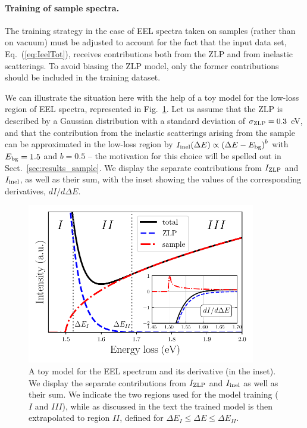 \paragraph{Training of sample spectra.}

The training strategy in the case of EEL spectra taken on samples (rather than on vacuum) must be adjusted
to account for the fact that the input data set, Eq.~(\ref{eq:IeelTot}), receives contributions
both from the ZLP and from inelastic scatterings.
%
To avoid biasing the ZLP model, only the former contributions should be
included in the training dataset.

We can illustrate the situation here with the help of a toy model for the low-loss
region of EEL spectra, represented in
Fig.~\ref{fig:EELS_toy}.
%
Let us assume that the ZLP is described by a Gaussian distribution with a standard deviation of $\sigma_{\rm ZLP}=0.3$ eV,
and that the contribution from the
inelastic scatterings arising from the sample can be approximated in the low-loss
region by $I_{\rm inel}(\Delta E)\propto \left( \Delta E - E_{\rm bg}\right)^b$ with $E_{\rm bg}=1.5$
and $b=0.5$ -- the motivation for this
choice will be spelled out in Sect.~\ref{sec:results_sample}.
%
We display the separate contributions from $I_{\rm ZLP}$
and $I_{\rm inel}$, as well as their sum, 
with the inset showing the values of the corresponding derivatives, $dI/d\Delta E$.

\begin{figure}[t]
    \centering
    \includegraphics[width=0.89\textwidth]{plots/EELS_toy.pdf}
    \caption{A toy model for the EEL spectrum and its
      derivative (in the inset).
      We display the separate contributions from $I_{\rm ZLP}$
      and $I_{\rm inel}$ as well as their sum.
      We indicate the two regions used for the model training ($I$ and $III$),
      while as discussed in the text the trained model is then
      extrapolated to region $II$, defined for $\Delta E_I \le \Delta E \le \Delta E_{II}$.
    }
    \label{fig:EELS_toy}
\end{figure}

